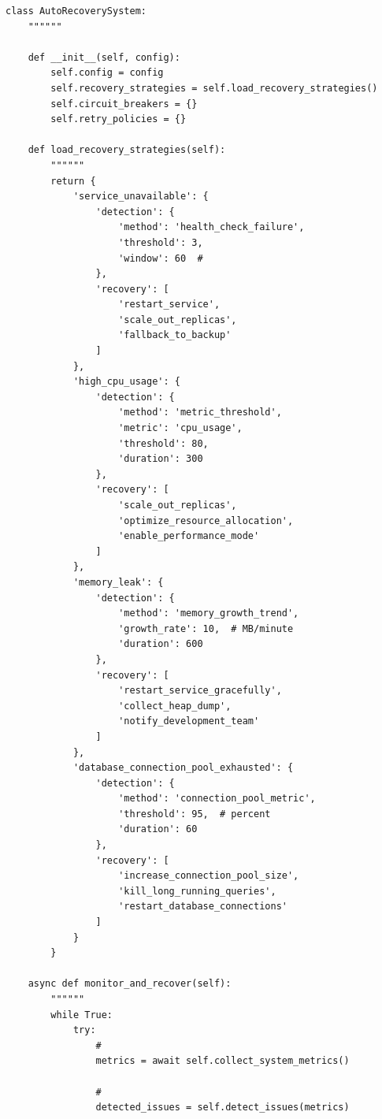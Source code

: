 \begin{lstlisting}[style=python]
class AutoRecoverySystem:
    """"""
    
    def __init__(self, config):
        self.config = config
        self.recovery_strategies = self.load_recovery_strategies()
        self.circuit_breakers = {}
        self.retry_policies = {}
        
    def load_recovery_strategies(self):
        """"""
        return {
            'service_unavailable': {
                'detection': {
                    'method': 'health_check_failure',
                    'threshold': 3,
                    'window': 60  # 
                },
                'recovery': [
                    'restart_service',
                    'scale_out_replicas',
                    'fallback_to_backup'
                ]
            },
            'high_cpu_usage': {
                'detection': {
                    'method': 'metric_threshold',
                    'metric': 'cpu_usage',
                    'threshold': 80,
                    'duration': 300
                },
                'recovery': [
                    'scale_out_replicas',
                    'optimize_resource_allocation',
                    'enable_performance_mode'
                ]
            },
            'memory_leak': {
                'detection': {
                    'method': 'memory_growth_trend',
                    'growth_rate': 10,  # MB/minute
                    'duration': 600
                },
                'recovery': [
                    'restart_service_gracefully',
                    'collect_heap_dump',
                    'notify_development_team'
                ]
            },
            'database_connection_pool_exhausted': {
                'detection': {
                    'method': 'connection_pool_metric',
                    'threshold': 95,  # percent
                    'duration': 60
                },
                'recovery': [
                    'increase_connection_pool_size',
                    'kill_long_running_queries',
                    'restart_database_connections'
                ]
            }
        }
    
    async def monitor_and_recover(self):
        """"""
        while True:
            try:
                # 
                metrics = await self.collect_system_metrics()
                
                # 
                detected_issues = self.detect_issues(metrics)
                

\end{lstlisting}
